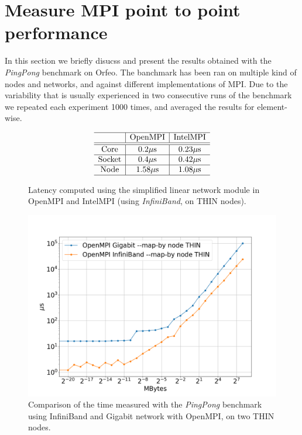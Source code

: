 \documentclass{article}
\begin{document}
\section{Measure MPI point to point performance}
In this section we briefly disucss and present the results obtained with the \emph{PingPong} benchmark on Orfeo. The banchmark has been ran on multiple kind of nodes and networks, and against different implementations of MPI. Due to the variability that is usually experienced in two consecutive runs of the benchmark we repeated each experiment 1000 times, and averaged the results for element-wise.

\begin{figure}[b!]
    $$
        \begin{array}{c | c | c} \hline
            & \text{OpenMPI} & \text{IntelMPI} \\ \hline
            \hline
            \text{Core} & 0.2 \mu \text{s}  & 0.23 \mu \text{s} \\ \hline
            \text{Socket} & 0.4 \mu \text{s}  & 0.42 \mu \text{s} \\ \hline
            \text{Node} & 1.58 \mu \text{s}  & 1.08 \mu \text{s} \\ \hline
        \end{array}
    $$
    \caption{Latency computed using the simplified linear network module in OpenMPI and IntelMPI (using \emph{InfiniBand}, on THIN nodes).}
    \label{tab:lat_ompi_intel}
\end{figure}

\begin{figure}[t!]
    \centering
    \includegraphics[width=\textwidth]{benchmark/infi_vs_giga_node.png}
    \caption{Comparison of the time measured with the \emph{PingPong} benchmark using InfiniBand and Gigabit network with OpenMPI, on two THIN nodes.}
    \label{fig:infi_vs_giga}
\end{figure}
\end{document}
